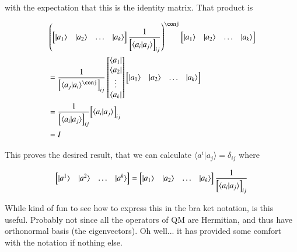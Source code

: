 \documentclass{article}
\newcommand{\ket}[1]{\lvert {#1} \rangle}
\newcommand{\bra}[1]{\langle {#1} \rvert}
\newcommand{\braket}[2]{\langle{#1} \vert {#2}\rangle}
\begin{document}
with the expectation that this is the identity matrix.  That product is

\begin{align*}
&\left(
\begin{bmatrix}
\ket{a_1} & \ket{a_2} & \hdots & \ket{a_k}
\end{bmatrix}
\inv{{\begin{bmatrix}
\braket{a_i}{a_j}
\end{bmatrix}}_{ij}} \right)^\conj
\begin{bmatrix}
\ket{a_1} & \ket{a_2} & \hdots & \ket{a_k}
\end{bmatrix} \\
&=
\inv{{\begin{bmatrix}
\braket{a_j}{a_i}^\conj
\end{bmatrix}}_{ij}} 
\begin{bmatrix}
\bra{a_1} \\ \bra{a_2} \\ \vdots \\ \bra{a_k}
\end{bmatrix}
\begin{bmatrix}
\ket{a_1} & \ket{a_2} & \hdots & \ket{a_k}
\end{bmatrix} \\
&=
\inv{{\begin{bmatrix}
\braket{a_i}{a_j}
\end{bmatrix}}_{ij}} 
{{\begin{bmatrix}
\braket{a_i}{a_j}
\end{bmatrix}}_{ij}} \\
&= I
\end{align*}

This proves the desired result, that we can calculate $\braket{a^i}{a_j} = \delta_{ij}$ where 

\begin{align*}
\begin{bmatrix}
\ket{a^1} & \ket{a^2} & \hdots & \ket{a^k}
\end{bmatrix} = 
\begin{bmatrix}
\ket{a_1} & \ket{a_2} & \hdots & \ket{a_k}
\end{bmatrix}
\inv{{\begin{bmatrix}
\braket{a_i}{a_j}
\end{bmatrix}}_{ij}}
\end{align*}

While kind of fun to see how to express this in the bra ket notation, is this useful.  Probably not since
all the operators of QM are Hermitian, and thus have orthonormal basis (the eigenvectors).  Oh well... it has
provided some comfort with the notation if nothing else.
\end{document}
